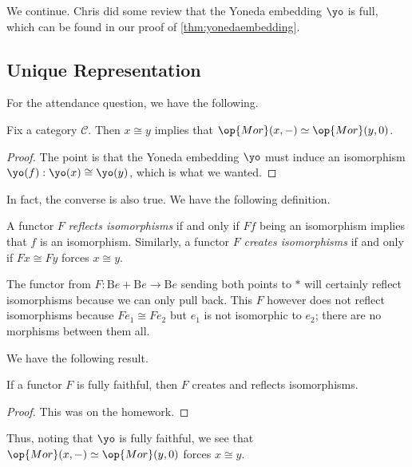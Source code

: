 \documentclass[../notes.tex]{subfiles}
\begin{document}

We continue. Chris did some review that the Yoneda embedding $\yo$ is full, which can be found in our proof of \autoref{thm:yonedaembedding}.

\subsection{Unique Representation}
For the attendance question, we have the following.
\begin{proposition}
	Fix a category $\mathcal C$. Then $x\cong y$ implies that $\op{Mor}(x,-)\simeq\op{Mor}(y,0)$.
\end{proposition}
\begin{proof}
	The point is that the Yoneda embedding $\yo$ must induce an isomorphism $\yo(f):\yo(x)\cong\yo(y)$, which is what we wanted.
\end{proof}
In fact, the converse is also true. We have the following definition.
\begin{definition}
	A functor $F$ \textit{reflects isomorphisms} if and only if $Ff$ being an isomorphism implies that $f$ is an isomorphism. Similarly, a functor $F$ \textit{creates isomorphisms} if and only if $Fx\cong Fy$ forces $x\cong y$.
\end{definition}
\begin{example}
	The functor from $F:\mathrm Be+\mathrm Be\to\mathrm Be$ sending both points to $*$ will certainly reflect isomorphisms because we can only pull back. This $F$ however does not reflect isomorphisms because $Fe_1\cong Fe_2$ but $e_1$ is not isomorphic to $e_2$; there are no morphisms between them all.
\end{example}
We have the following result.
\begin{proposition}
	If a functor $F$ is fully faithful, then $F$ creates and reflects isomorphisms.
\end{proposition}
\begin{proof}
	This was on the homework.
\end{proof}
\begin{remark}
	Thus, noting that $\yo$ is fully faithful, we see that $\op{Mor}(x,-)\simeq\op{Mor}(y,0)$ forces $x\cong y$.
\end{remark}
\end{document}
